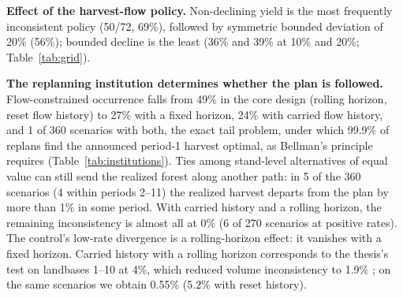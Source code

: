 \textbf{Effect of the harvest-flow policy.} Non-declining yield is the most frequently inconsistent policy (50/72, 69\%), followed by symmetric bounded deviation of 20\% (56\%); bounded decline is the least (36\% and 39\% at 10\% and 20\%; Table~\ref{tab:grid}).

\textbf{The replanning institution determines whether the plan is followed.} Flow-constrained occurrence falls from 49\% in the core design (rolling horizon, reset flow history) to 27\% with a fixed horizon, 24\% with carried flow history, and 1 of 360 scenarios with both, the exact tail problem, under which 99.9\% of replans find the announced period-1 harvest optimal, as Bellman's principle requires (Table~\ref{tab:institutions}). Ties among stand-level alternatives of equal value can still send the realized forest along another path: in 5 of the 360 scenarios (4 within periods 2--11) the realized harvest departs from the plan by more than 1\% in some period. With carried history and a rolling horizon, the remaining inconsistency is almost all at 0\% (6 of 270 scenarios at positive rates). The control's low-rate divergence is a rolling-horizon effect: it vanishes with a fixed horizon. Carried history with a rolling horizon corresponds to the thesis's test on landbases 1--10 at 4\%, which reduced volume inconsistency to 1.9\% \citep[pp.~118--120]{daugherty1991credibility}; on the same scenarios we obtain 0.55\% (5.2\% with reset history).


